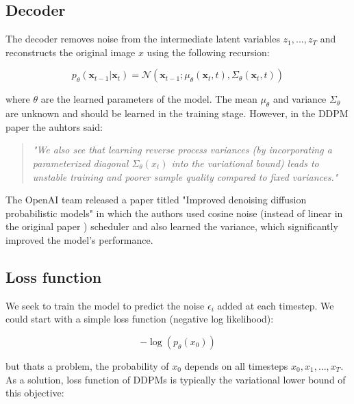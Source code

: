 \subsection{Decoder}

The decoder removes noise from the intermediate latent variables $z_1, ..., z_T$ and reconstructs the original image $x$ using the following recursion:

\begin{equation}
    p_\theta(\mathbf{x}_{t-1} | \mathbf{x}_t) = \mathcal{N}(\mathbf{x}_{t-1}; \mu_\theta(\mathbf{x}_t, t), \Sigma_\theta(\mathbf{x}_t, t))
    \label{eq:reverse_diffusion}
\end{equation}

where $\theta$ are the learned parameters of the model. The mean $\mu_\theta$ and variance $\Sigma_\theta$ are unknown and should be learned in the training stage. However, in the DDPM paper \cite{ddpm} the auhtors said:

\begin{quote}
    \textit{"We also see that learning reverse process variances (by incorporating a parameterized diagonal $\Sigma_\theta(x_t)$ into the variational bound) leads to unstable training and poorer sample quality compared to fixed variances."} \cite{ddpm}
\end{quote}

The OpenAI team released a paper titled "Improved denoising diffusion probabilistic models" \cite{openai_improved_ddpm} in which the authors used cosine noise (instead of linear in the original paper \cite{ddpm}) scheduler and also learned the variance, which significantly improved the model's performance.








\subsection{Loss function}

We seek to train the model to predict the noise $\epsilon_i$ added at each timestep. We could start with a simple loss function (negative log likelihood):

\[ -\log (p_\theta (x_0)) \]

but thats a problem, the probability of $x_0$ depends on all timesteps $x_0, x_1, ..., x_T$. As a solution, loss function of DDPMs is typically the variational lower bound of this objective:

